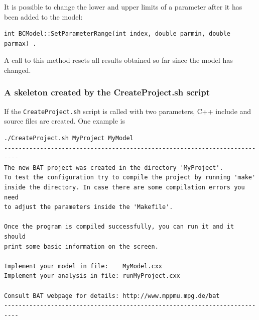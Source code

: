 \documentclass[11pt, a4paper]{article}
\begin{document}
It is possible to change the lower and upper limits of a parameter
after it has been added to the model:
%
\begin{verbatim}
int BCModel::SetParameterRange(int index, double parmin, double parmax) .
\end{verbatim}
%
A call to this method resets all results obtained so far since the
model has changed.


\subsubsection{A skeleton created by the CreateProject.sh script}
\label{subsubsection:createproject}

If the \verb|CreateProject.sh| script is called with two parameters,
C++ include and source files are created. One example is

\begin{verbatim}
./CreateProject.sh MyProject MyModel
--------------------------------------------------------------------------
The new BAT project was created in the directory 'MyProject'.
To test the configuration try to compile the project by running 'make'
inside the directory. In case there are some compilation errors you need
to adjust the parameters inside the 'Makefile'.

Once the program is compiled successfully, you can run it and it should
print some basic information on the screen.

Implement your model in file:    MyModel.cxx
Implement your analysis in file: runMyProject.cxx

Consult BAT webpage for details: http://www.mppmu.mpg.de/bat
--------------------------------------------------------------------------
\end{verbatim}
\end{document}
